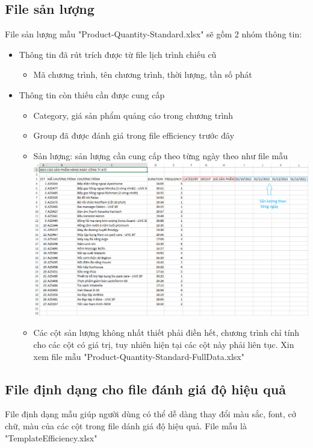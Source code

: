 \documentclass[11pt]{article}
\begin{document}
	\subsection{File sản lượng}
	File sản lượng mẫu "Product-Quantity-Standard.xlsx" sẽ gồm 2 nhóm thông tin:
	\begin{itemize}
		\item Thông tin đã rút trích được từ file lịch trình chiếu cũ
		\begin{itemize}
			\item Mã chương trình, tên chương trình, thời lượng, tần số phát
		\end{itemize}
		\item Thông tin còn thiếu cần được cung cấp
		\begin{itemize}
			\item Category, giá sản phẩm quảng cáo trong chương trình
			\item Group đã được đánh giá trong file efficiency trước đây
			\item Sản lượng: sản lượng cần cung cấp theo từng ngày theo như file mẫu\\
			\includegraphics[width=140mm]{im2.png}
			\item Các cột sản lượng không nhất thiết phải điền hết, chương trình chỉ tính cho các cột có giá trị, tuy nhiên hiện tại các cột này phải liên tục. Xin xem file mẫu "Product-Quantity-Standard-FullData.xlsx"
		\end{itemize}
	\end{itemize}
	\subsection{File định dạng cho file đánh giá độ hiệu quả}	
	File định dạng mẫu giúp người dùng có thể dễ dàng thay đổi màu sắc, font, cở chữ, màu của các cột trong file dánh giá độ hiệu quả. File mẫu là "TemplateEfficiency.xlsx"
	\newpage
\end{document}
